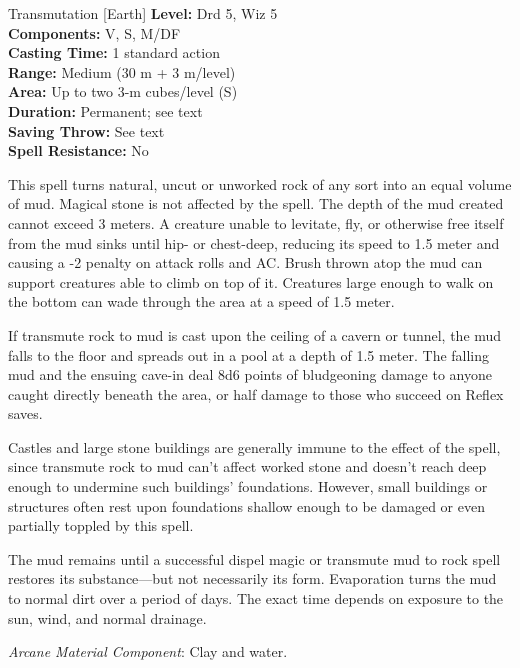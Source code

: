 {Transmutation [Earth]}
{
	\textbf{Level:}
	Drd 5, Wiz 5\\
	\textbf{Components:}
	V, S, M/DF\\
	\textbf{Casting Time:}
	1 standard action\\
	\textbf{Range:}
	Medium (30 m + 3 m/level)\\
	\textbf{Area:}
	Up to two 3-m cubes/level (S)\\
	\textbf{Duration:}
	Permanent; see text\\
	\textbf{Saving Throw:}
	See text\\
	\textbf{Spell Resistance:}
	No\\
}
{
	This spell turns natural, uncut or unworked rock of any sort into an equal volume of mud. Magical stone is not affected by the spell. The depth of the mud created cannot exceed 3 meters. A creature unable to levitate, fly, or otherwise free itself from the mud sinks until hip- or chest-deep, reducing its speed to 1.5 meter and causing a -2 penalty on attack rolls and AC. Brush thrown atop the mud can support creatures able to climb on top of it. Creatures large enough to walk on the bottom can wade through the area at a speed of 1.5 meter.

	If transmute rock to mud is cast upon the ceiling of a cavern or tunnel, the mud falls to the floor and spreads out in a pool at a depth of 1.5 meter. The falling mud and the ensuing cave-in deal 8d6 points of bludgeoning damage to anyone caught directly beneath the area, or half damage to those who succeed on Reflex saves.

	Castles and large stone buildings are generally immune to the effect of the spell, since transmute rock to mud can't affect worked stone and doesn't reach deep enough to undermine such buildings' foundations. However, small buildings or structures often rest upon foundations shallow enough to be damaged or even partially toppled by this spell.

	The mud remains until a successful dispel magic or transmute mud to rock spell restores its substance---but not necessarily its form. Evaporation turns the mud to normal dirt over a period of days. The exact time depends on exposure to the sun, wind, and normal drainage.

	\textit{Arcane Material Component}:
	Clay and water.

}
